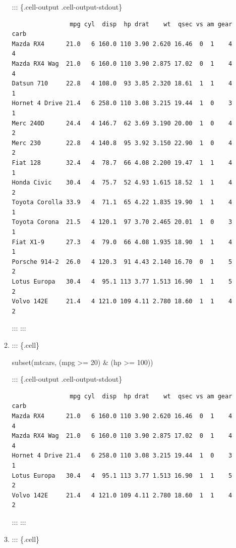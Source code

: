 \documentclass[
  letterpaper,
  DIV=11,
  numbers=noendperiod]{scrreprt}
\newenvironment{Shaded}{\begin{snugshade}}{\end{snugshade}}
\newcommand{\DecValTok}[1]{\textcolor[rgb]{0.68,0.00,0.00}{#1}}
\newcommand{\FunctionTok}[1]{\textcolor[rgb]{0.28,0.35,0.67}{#1}}
\newcommand{\NormalTok}[1]{\textcolor[rgb]{0.00,0.23,0.31}{#1}}
\newcommand{\SpecialCharTok}[1]{\textcolor[rgb]{0.37,0.37,0.37}{#1}}
\begin{document}
\begin{enumerate}
\begin{enumerate}
    ::: \{.cell-output .cell-output-stdout\}

\begin{verbatim}
                mpg cyl  disp  hp drat    wt  qsec vs am gear carb
Mazda RX4      21.0   6 160.0 110 3.90 2.620 16.46  0  1    4    4
Mazda RX4 Wag  21.0   6 160.0 110 3.90 2.875 17.02  0  1    4    4
Datsun 710     22.8   4 108.0  93 3.85 2.320 18.61  1  1    4    1
Hornet 4 Drive 21.4   6 258.0 110 3.08 3.215 19.44  1  0    3    1
Merc 240D      24.4   4 146.7  62 3.69 3.190 20.00  1  0    4    2
Merc 230       22.8   4 140.8  95 3.92 3.150 22.90  1  0    4    2
Fiat 128       32.4   4  78.7  66 4.08 2.200 19.47  1  1    4    1
Honda Civic    30.4   4  75.7  52 4.93 1.615 18.52  1  1    4    2
Toyota Corolla 33.9   4  71.1  65 4.22 1.835 19.90  1  1    4    1
Toyota Corona  21.5   4 120.1  97 3.70 2.465 20.01  1  0    3    1
Fiat X1-9      27.3   4  79.0  66 4.08 1.935 18.90  1  1    4    1
Porsche 914-2  26.0   4 120.3  91 4.43 2.140 16.70  0  1    5    2
Lotus Europa   30.4   4  95.1 113 3.77 1.513 16.90  1  1    5    2
Volvo 142E     21.4   4 121.0 109 4.11 2.780 18.60  1  1    4    2
\end{verbatim}

    ::: :::
  \item
    ::: \{.cell\}

\begin{Shaded}
\begin{Highlighting}[]
\FunctionTok{subset}\NormalTok{(mtcars, (mpg }\SpecialCharTok{\textgreater{}=} \DecValTok{20}\NormalTok{) }\SpecialCharTok{\&}\NormalTok{ (hp }\SpecialCharTok{\textgreater{}=} \DecValTok{100}\NormalTok{))}
\end{Highlighting}
\end{Shaded}

    ::: \{.cell-output .cell-output-stdout\}

\begin{verbatim}
                mpg cyl  disp  hp drat    wt  qsec vs am gear carb
Mazda RX4      21.0   6 160.0 110 3.90 2.620 16.46  0  1    4    4
Mazda RX4 Wag  21.0   6 160.0 110 3.90 2.875 17.02  0  1    4    4
Hornet 4 Drive 21.4   6 258.0 110 3.08 3.215 19.44  1  0    3    1
Lotus Europa   30.4   4  95.1 113 3.77 1.513 16.90  1  1    5    2
Volvo 142E     21.4   4 121.0 109 4.11 2.780 18.60  1  1    4    2
\end{verbatim}

    ::: :::
  \item
    ::: \{.cell\}


\end{enumerate}
\end{enumerate}
\end{document}

